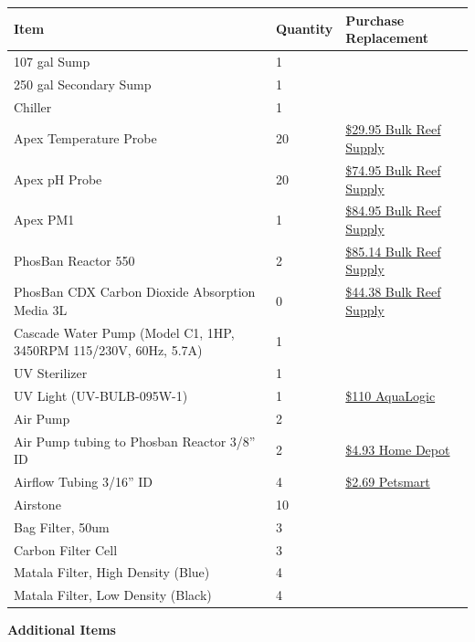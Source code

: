 \documentclass[
]{book}
\begin{document}
\begin{longtable}[]{@{}lll@{}}
\toprule
Item & Quantity & Purchase Replacement \\
\midrule
\endhead
107 gal Sump & 1 & \\
250 gal Secondary Sump & 1 & \\
Chiller & 1 & \\
Apex Temperature Probe & 20 & \href{https://www.bulkreefsupply.com/temperature-probe-neptune-systems.html}{\$29.95 Bulk Reef Supply} \\
Apex pH Probe & 20 & \href{https://www.bulkreefsupply.com/lab-grade-double-junction-ph-probe-neptune-systems.html}{\$74.95 Bulk Reef Supply} \\
Apex PM1 & 1 & \href{https://www.bulkreefsupply.com/ph-orp-probe-module-pm1-neptune-systems.html}{\$84.95 Bulk Reef Supply} \\
PhosBan Reactor 550 & 2 & \href{https://www.bulkreefsupply.com/phosban-reactor-550.html}{\$85.14 Bulk Reef Supply} \\
PhosBan CDX Carbon Dioxide Absorption Media 3L & 0 & \href{https://www.bulkreefsupply.com/cdx-carbon-dioxide-adsorption-media-two-little-fishies.html}{\$44.38 Bulk Reef Supply} \\
Cascade Water Pump (Model C1, 1HP, 3450RPM 115/230V, 60Hz, 5.7A) & 1 & \\
UV Sterilizer & 1 & \\
UV Light (UV-BULB-095W-1) & 1 & \href{https://aqualogicinc.com/product/aqua-logic-uv-lamps/}{\$110 AquaLogic} \\
Air Pump & 2 & \\
Air Pump tubing to Phosban Reactor 3/8'' ID & 2 & \href{https://www.homedepot.com/p/UDP-3-8-in-I-D-x-1-2-in-O-D-x-10-ft-Clear-Vinyl-Tubing-T10006008/304185141}{\$4.93 Home Depot} \\
Airflow Tubing 3/16'' ID & 4 & \href{https://www.petsmart.com/fish/filters-and-pumps/air-and-water-pumps/grreat-choice-airline-tubing-5202767.html}{\$2.69 Petsmart} \\
Airstone & 10 & \\
Bag Filter, 50um & 3 & \\
Carbon Filter Cell & 3 & \\
Matala Filter, High Density (Blue) & 4 & \\
Matala Filter, Low Density (Black) & 4 & \\
\bottomrule
\end{longtable}

\textbf{Additional Items}
\end{document}
